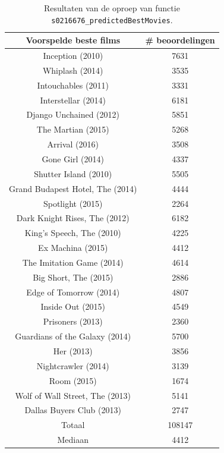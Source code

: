 \begin{table}[H]
\centering
\begin{tabular}{c|c}
\textbf{Voorspelde beste films} & \textbf{\# beoordelingen} \\
\hline
Inception (2010)                & 7631 \\
Whiplash (2014)                 & 3535 \\
Intouchables (2011)             & 3331 \\
Interstellar (2014)             & 6181 \\
Django Unchained (2012)         & 5851 \\
The Martian (2015)              & 5268 \\
Arrival (2016)                  & 3508 \\
Gone Girl (2014)                & 4337 \\
Shutter Island (2010)           & 5505 \\
Grand Budapest Hotel, The (2014)& 4444 \\
Spotlight (2015)                & 2264 \\
Dark Knight Rises, The (2012)   & 6182 \\
King's Speech, The (2010)       & 4225 \\
Ex Machina (2015)               & 4412 \\
The Imitation Game (2014)       & 4614 \\
Big Short, The (2015)           & 2886 \\
Edge of Tomorrow (2014)         & 4807 \\
Inside Out (2015)               & 4549 \\
Prisoners (2013)                & 2360 \\
Guardians of the Galaxy (2014)  & 5700 \\
Her (2013)                      & 3856 \\
Nightcrawler (2014)             & 3139 \\
Room (2015)                     & 1674 \\
Wolf of Wall Street, The (2013) & 5141 \\
Dallas Buyers Club (2013)       & 2747\\
\hline
Totaal & 108147 \\
Mediaan & 4412
\end{tabular}
\caption{Resultaten van de oproep van functie \texttt{s0216676\_predictedBestMovies}.}
\label{fig:op16b}
\end{table}

